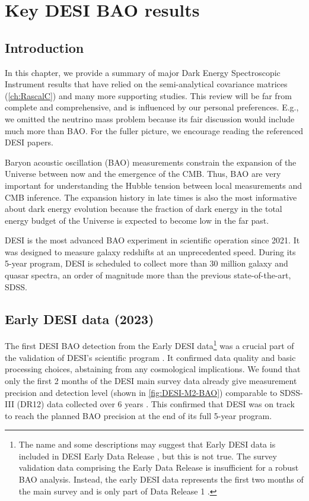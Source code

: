 \chapter{Key DESI BAO results}
\label{ch:DESI-key}
\graphicspath{{DESI-key/}}

\section{Introduction}

In this chapter, we provide a summary of major Dark Energy Spectroscopic Instrument results that have relied on the semi-analytical covariance matrices (\cref{ch:RascalC}) and many more supporting studies.
This review will be far from complete and comprehensive, and is influenced by our personal preferences.
E.g., we omitted the neutrino mass problem \citep[see e.g.][]{Y3.cpe-s2.Elbers.2025} because its fair discussion would include much more than BAO.
For the fuller picture, we encourage reading the referenced DESI papers.

Baryon acoustic oscillation (BAO) measurements constrain the expansion of the Universe between now and the emergence of the CMB.
Thus, BAO are very important for understanding the Hubble tension between local measurements and CMB inference.
The expansion history in late times is also the most informative about dark energy evolution because the fraction of dark energy in the total energy budget of the Universe is expected to become low in the far past.

DESI is the most advanced BAO experiment in scientific operation since 2021.
It was designed to measure galaxy redshifts at an unprecedented speed.
During its 5-year program, DESI is scheduled to collect more than 30 million galaxy and quasar spectra, an order of magnitude more than the previous state-of-the-art, SDSS.

\section{Early DESI data (2023)}

The first DESI BAO detection \citep{BAO.EDR.Moon.2023} from the Early DESI data\footnote{The name and some descriptions may suggest that Early DESI data is included in DESI Early Data Release \citep{DESI2023b.KP1.EDR}, but this is not true. The survey validation data comprising the Early Data Release is insufficient for a robust BAO analysis. Instead, the early DESI data represents the first two months of the main survey and is only part of Data Release 1 \citep{DESI2024.I.DR1}.} was a crucial part of the validation of DESI's scientific program \citep{DESI2023a.KP1.SV}.
It confirmed data quality and basic processing choices, abstaining from any cosmological implications.
We found that only the first 2 months of the DESI main survey data already give measurement precision and detection level (shown in \cref{fig:DESI-M2-BAO}) comparable to SDSS-III (DR12) data collected over 6 years \citep{SDSS3-Ross17}.
This confirmed that DESI was on track to reach the planned BAO precision at the end of its full 5-year program.

